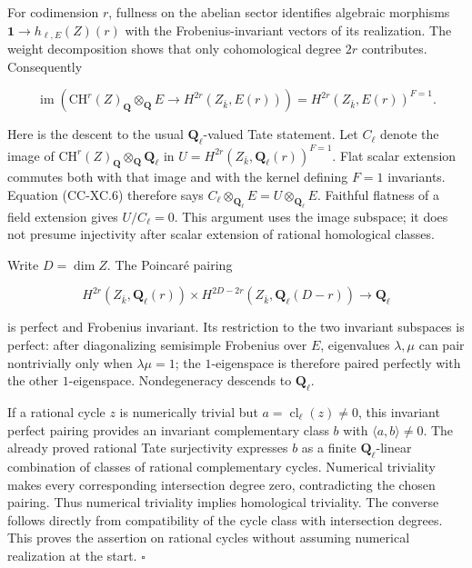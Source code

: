 For codimension \(r\), fullness on the abelian sector identifies
algebraic morphisms \(\mathbf 1\to h_{\ell,E}(Z)(r)\) with the
Frobenius-invariant vectors of its realization. The weight decomposition
shows that only cohomological degree \(2r\) contributes. Consequently

\[
 \operatorname{im}\!\left(
 \mathrm{CH}^r(Z)_{\mathbf Q}\otimes_{\mathbf Q}E
 \longrightarrow H^{2r}(Z_{\bar k},E(r))
 \right)
 =H^{2r}(Z_{\bar k},E(r))^{F=1}.                 \tag{CC-XC.6}
\]

Here is the descent to the usual \(\mathbf Q_\ell\)-valued Tate
statement. Let \(C_\ell\) denote the image of
\(\mathrm{CH}^r(Z)_{\mathbf Q}\otimes_{\mathbf Q}\mathbf Q_\ell\) in
\(U=H^{2r}(Z_{\bar k},\mathbf Q_\ell(r))^{F=1}\). Flat scalar extension
commutes both with that image and with the kernel defining \(F=1\)
invariants. Equation (CC-XC.6) therefore says
\(C_\ell\otimes_{\mathbf Q_\ell}E=U\otimes_{\mathbf Q_\ell}E\). Faithful
flatness of a field extension gives \(U/C_\ell=0\). This argument uses
the image subspace; it does not presume injectivity after scalar
extension of rational homological classes.

Write \(D=\dim Z\). The Poincaré pairing

\[
 H^{2r}(Z_{\bar k},\mathbf Q_\ell(r))
 \times
 H^{2D-2r}(Z_{\bar k},\mathbf Q_\ell(D-r))
 \longrightarrow\mathbf Q_\ell
\]

is perfect and Frobenius invariant. Its restriction to the two invariant
subspaces is perfect: after diagonalizing semisimple Frobenius over
\(E\), eigenvalues \(\lambda,\mu\) can pair nontrivially only when
\(\lambda\mu=1\); the \(1\)-eigenspace is therefore paired perfectly
with the other \(1\)-eigenspace. Nondegeneracy descends to
\(\mathbf Q_\ell\).

If a rational cycle \(z\) is numerically trivial but
\(a=\operatorname{cl}_\ell(z)\ne0\), this invariant perfect pairing
provides an invariant complementary class \(b\) with
\(\langle a,b\rangle\ne0\). The already proved rational Tate
surjectivity expresses \(b\) as a finite \(\mathbf Q_\ell\)-linear
combination of classes of rational complementary cycles. Numerical
triviality makes every corresponding intersection degree zero,
contradicting the chosen pairing. Thus numerical triviality implies
homological triviality. The converse follows directly from compatibility
of the cycle class with intersection degrees. This proves the assertion
on rational cycles without assuming numerical realization at the start.
\(\square\)

